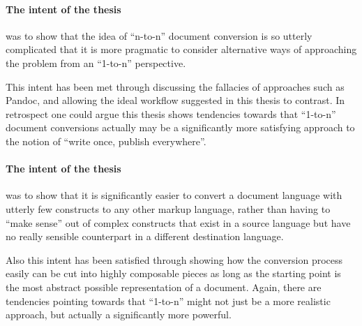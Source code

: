\documentclass{scrreprt}
\begin{document}
\paragraph{The intent of the thesis}
was to show that the idea of ``n-to-n'' document conversion is so utterly complicated that it is more pragmatic to consider alternative ways of approaching the problem from an ``1-to-n'' perspective.

This intent has been met through discussing the fallacies of approaches such as Pandoc, and allowing the ideal workflow suggested in this thesis to contrast. In retrospect one could argue this thesis shows tendencies towards that ``1-to-n'' document conversions actually may be a significantly more satisfying approach to the notion of ``write once, publish everywhere''.


\paragraph{The intent of the thesis}
was to show that it is significantly easier to convert a document language with utterly few constructs to any other markup language, rather than having to ``make sense'' out of complex constructs that exist in a source language but have no really sensible counterpart in a different destination language.

Also this intent has been satisfied through showing how the conversion process easily can be cut into highly composable pieces as long as the starting point is the most abstract possible representation of a document. Again, there are tendencies pointing towards that ``1-to-n'' might not just be a more realistic approach, but actually a significantly more powerful.

















%
%
%
%
%
%
\end{document}
